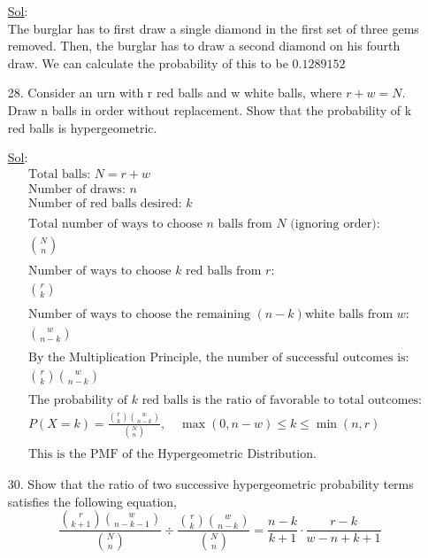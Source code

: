 \begin{enumerate}
    \underline{Sol}:\\
    The burglar has to first draw a single diamond in the first set
    of three gems removed. Then, the burglar has to draw a second
    diamond on his fourth draw. We can calculate the probability of
    this to be \(\boxed{0.1289152}\)

  \item[28.] Consider an urn with r red balls and w white balls,
    where \(r + w = N\). Draw n balls in order without replacement.
    Show that the probability of k red balls is hypergeometric.

    \underline{Sol}:\\
    $$
    \begin{aligned}
      & \text{Total balls: } N = r + w \\
      & \text{Number of draws: } n \\
      & \text{Number of red balls desired: } k \\
      \\
      & \text{Total number of ways to choose } n \text{ balls from }
      N \text{ (ignoring order):} \\
      & \binom{N}{n} \\
      \\
      & \text{Number of ways to choose } k \text{ red balls from } r \text{:} \\
      & \binom{r}{k} \\
      \\
      & \text{Number of ways to choose the remaining } (n-k) \text{
      white balls from } w \text{:} \\
      & \binom{w}{n-k} \\
      \\
      & \text{By the Multiplication Principle, the number of
      successful outcomes is:} \\
      & \binom{r}{k} \binom{w}{n-k} \\
      \\
      & \text{The probability of } k \text{ red balls is the ratio of
      favorable to total outcomes:} \\
      & P(X = k) = \frac{\binom{r}{k} \binom{w}{n-k}}{\binom{N}{n}},
      \quad \max(0, n-w) \le k \le \min(n, r) \\
      \\
      & \text{This is the PMF of the Hypergeometric Distribution.}
    \end{aligned}$$

  \item[30.] Show that the ratio of two successive hypergeometric
    probability terms satisfies the following equation,
    \[
      \frac{\binom{r}{k + 1} \binom{w}{n - k - 1}}{\binom{N}{n}} \div
      \frac{\binom{r}{k} \binom{w}{n-k}}{\binom{N}{n}} = \frac{n -
      k}{k + 1} \cdot \frac{r - k}{w - n + k + 1}
    \]


\end{enumerate}
